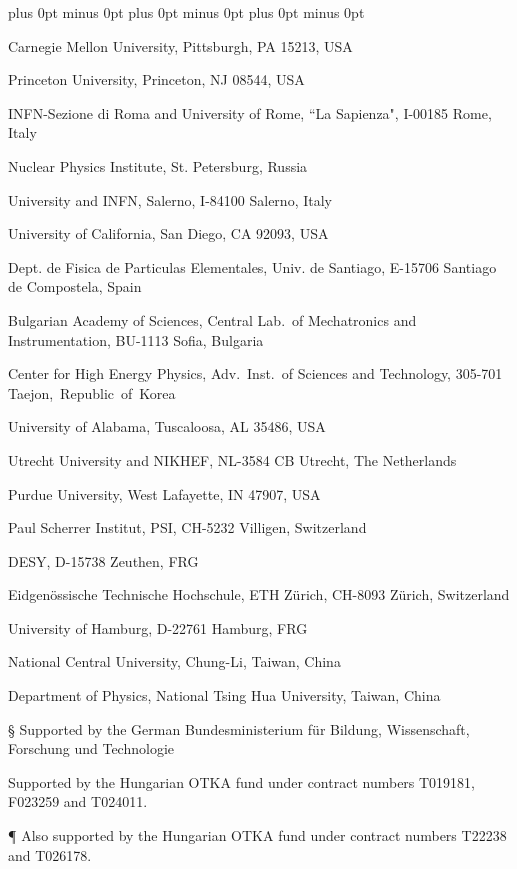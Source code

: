 \documentclass[12pt,a4paper,dvips]{article}
\begin{document}
{\begin{list}{A}{\itemsep=0pt plus 0pt minus 0pt\parsep=0pt plus 0pt minus 0pt
                \topsep=0pt plus 0pt minus 0pt}
\item[\cmu] Carnegie Mellon University, Pittsburgh, PA 15213, USA
\item[\prince] Princeton University, Princeton, NJ 08544, USA
\item[\rome] INFN-Sezione di Roma and University of Rome, ``La Sapienza",
     I-00185 Rome, Italy
\item[\peters] Nuclear Physics Institute, St. Petersburg, Russia
\item[\salerno] University and INFN, Salerno, I-84100 Salerno, Italy
\item[\ucsd] University of California, San Diego, CA 92093, USA
\item[\santiago] Dept. de Fisica de Particulas Elementales, Univ. de Santiago,
     E-15706 Santiago de Compostela, Spain
\item[\sofia] Bulgarian Academy of Sciences, Central Lab.~of 
     Mechatronics and Instrumentation, BU-1113 Sofia, Bulgaria
\item[\korea] Center for High Energy Physics, Adv.~Inst.~of Sciences
     and Technology, 305-701 Taejon,~Republic~of~{Korea}
\item[\alabama] University of Alabama, Tuscaloosa, AL 35486, USA
\item[\utrecht] Utrecht University and NIKHEF, NL-3584 CB Utrecht, 
     The Netherlands
\item[\purdue] Purdue University, West Lafayette, IN 47907, USA
\item[\psinst] Paul Scherrer Institut, PSI, CH-5232 Villigen, Switzerland
\item[\zeuthen] DESY, D-15738 Zeuthen, 
     FRG
\item[\eth] Eidgen\"ossische Technische Hochschule, ETH Z\"urich,
     CH-8093 Z\"urich, Switzerland
\item[\hamburg] University of Hamburg, D-22761 Hamburg, FRG
\item[\taiwan] National Central University, Chung-Li, Taiwan, China
\item[\tsinghua] Department of Physics, National Tsing Hua University,
      Taiwan, China
\item[\S]  Supported by the German Bundesministerium 
        f\"ur Bildung, Wissenschaft, Forschung und Technologie
\item[\ddag] Supported by the Hungarian OTKA fund under contract
numbers T019181, F023259 and T024011.
\item[\P] Also supported by the Hungarian OTKA fund under contract
  numbers T22238 and T026178.

\end{list}}
\end{document}
